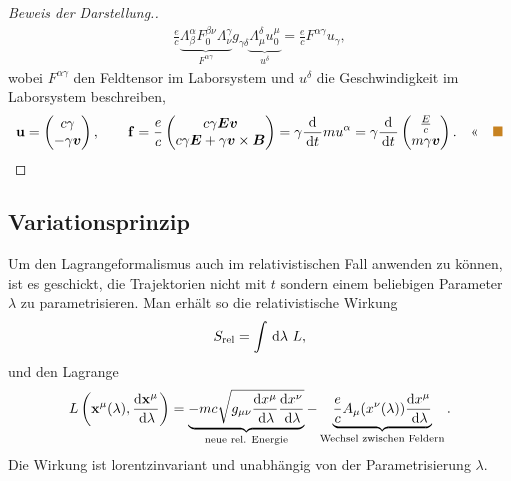 \begin{bsp}
\begin{proof}[Beweis der Darstellung.]
\begin{align*}
\frac{e}{c}\underbrace{\Lambda_\beta^\alpha
F_0^{\beta\nu}\Lambda_\nu^\gamma}_{F^{\alpha\gamma}} g_{\gamma\delta}
\underbrace{\Lambda_{\mu}^\delta u_0^\mu}_{u^\delta}
= \frac{e}{c}F^{\alpha\gamma}u_\gamma,
\end{align*}
wobei $F^{\alpha\gamma}$ den Feldtensor im Laborsystem und $u^\delta$ die
Geschwindigkeit im Laborsystem beschreiben,
\begin{align*}
\rvec{u} = 
\begin{pmatrix}
c\gamma\\ -\gamma\vec{v}
\end{pmatrix},\qquad \rvec{f}
=
\frac{e}{c}
\begin{pmatrix}
c\gamma \vec{E}\vec{v}\\
c\gamma\vec{E} + \gamma \vec{v}\times\vec{B}
\end{pmatrix}
= \gamma\frac{\diffd}{\dt}m u^\alpha
= \gamma\frac{\diffd}{\dt}
\begin{pmatrix}
\frac{E}{c}\\ m\gamma\vec{v}
\end{pmatrix}.\qedhere\bsphere
\end{align*}
\end{proof}
\end{bsp}

\subsection{Variationsprinzip}
Um den Lagrangeformalismus auch im relativistischen Fall anwenden zu können,
ist es geschickt, die Trajektorien nicht mit $t$ sondern einem beliebigen
Parameter $\lambda$ zu parametrisieren. Man erhält so die relativistische
Wirkung
\begin{align*}
S_{\text{rel}} = \int \,\mathrm{d} \lambda\ L,
\end{align*}
und den Lagrange
\begin{align*}
L\left(\bm{\mathrm{x}}^\mu(\lambda), \frac{\mathrm{d} \bm{\mathrm{x}}^\mu}{\,\mathrm{d} \lambda} \right)
= \underbrace{-mc\sqrt{g_{\mu\nu}\frac{\mathrm{d}
x^\mu}{\,\mathrm{d} \lambda}\frac{\mathrm{d} x^\nu}{\,\mathrm{d} \lambda}}}_{\text{neue rel.
Energie}} - \underbrace{\frac{e}{c}A_\mu (x^\nu(\lambda))\frac{\mathrm{d} x^\mu}{\,\mathrm{d} \lambda}}_{\text{Wechsel zwischen
Feldern}}.
\end{align*}
Die Wirkung ist lorentzinvariant und unabhängig von der Parametrisierung
$\lambda$.

